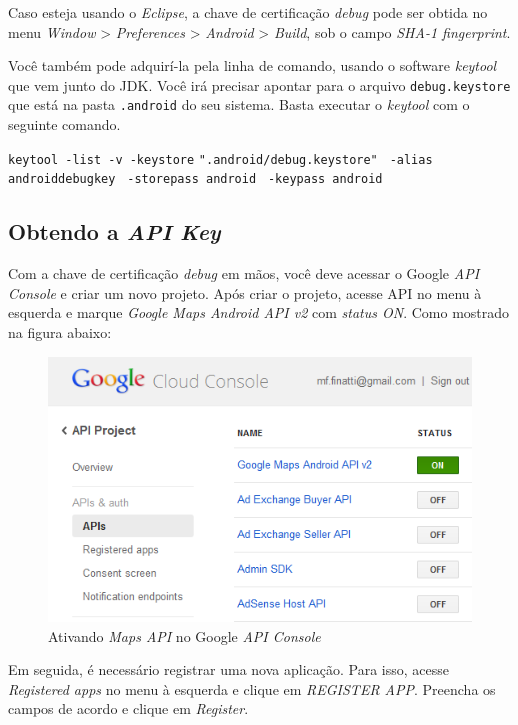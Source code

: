 \documentclass[a4paper,12pt,brazil]{book}
\begin{document}
\begin{singlespace}
	 	Caso esteja usando o \emph{Eclipse}, a chave de certificação \emph{debug} pode ser obtida no menu \emph{Window} > \emph{Preferences} > \emph{Android}  > \emph{Build}, sob o campo \emph{SHA-1 fingerprint}.

		Você também pode adquirí-la pela linha de comando, usando o software \emph{keytool} que vem junto do JDK. Você irá precisar apontar para o arquivo \texttt{debug.keystore} que está na pasta \texttt{.android} do seu sistema. Basta executar o \emph{keytool} com o seguinte comando.

		\texttt{keytool -list -v -keystore} \texttt{".android/debug.keystore"} \texttt{ -alias androiddebugkey} \texttt{ -storepass android} \texttt{ -keypass android}

		\subsection{Obtendo a \emph{API Key}}

		Com a chave de certificação \emph{debug} em mãos, você deve acessar o Google \emph{API Console} e criar um novo projeto. Após criar o projeto, acesse API no menu à esquerda e marque \emph{Google Maps Android API v2} com \emph{status ON}. Como mostrado na figura abaixo:

		\begin{figure}[H]
		  \centering
		  \includegraphics{figuras/api/localizacao/console1.png}
		  \caption{Ativando \emph{Maps API} no Google \emph{API Console}}
		  \label{fig:apiconsole1}
		\end{figure}

		Em seguida, é necessário registrar uma nova aplicação. Para isso, acesse \emph{Registered apps} no menu à esquerda e clique em \emph{REGISTER APP}. Preencha os campos de acordo e clique em \emph{Register}.


\end{singlespace}
\end{document}
